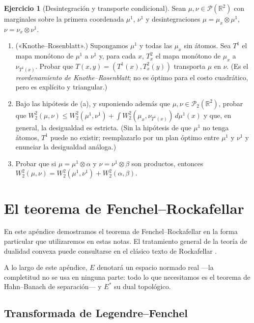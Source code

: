 \documentclass[12pt, a4paper]{amsbook}
\newcommand{\R}{{\mathbb R}}
\theoremstyle{remark}
\theoremstyle{definition}
\newtheorem{ejercicio}{Ejercicio}[chapter]
\numberwithin{section}{chapter}
\numberwithin{subsection}{section}
\numberwithin{equation}{section}
\numberwithin{figure}{chapter}
\begin{document}
\begin{ejercicio}[Desintegración y transporte condicional]\label{ejer.desint.condicional}
Sean $\mu,\nu\in\mathcal P(\R^2)$ con marginales sobre la primera coordenada
$\mu^1$, $\nu^1$ y desintegraciones $\mu=\mu_x\otimes\mu^1$, $\nu=\nu_x\otimes\nu^1$.
\begin{enumerate}[label=(\alph*)]
\item («Knothe--Rosenblatt».) Supongamos $\mu^1$ y todas las $\mu_x$ sin
átomos. Sea $T^1$ el mapa monótono de $\mu^1$ a $\nu^1$ y, para cada $x$,
$T^2_x$ el mapa monótono de $\mu_x$ a $\nu_{T^1(x)}$. Probar que
$T(x,y)=(T^1(x),T^2_x(y))$ transporta $\mu$ en $\nu$. (Es el
\emph{reordenamiento de Knothe--Rosenblatt}; no es óptimo para el costo
cuadrático, pero es explícito y triangular.)
\item Bajo las hipótesis de (a), y suponiendo además que $\mu,\nu\in\mathcal P_2(\R^2)$,
probar que $W_2^2(\mu,\nu)\le W_2^2(\mu^1,\nu^1)+\int W_2^2(\mu_x,\nu_{T^1(x)})\,d\mu^1(x)$
y que, en general, la desigualdad es estricta. (Sin la hipótesis de que
$\mu^1$ no tenga átomos, $T^1$ puede no existir; reemplazarlo por un plan
óptimo entre $\mu^1$ y $\nu^1$ y enunciar la desigualdad análoga.)
\item Probar que si $\mu=\mu^1\otimes\alpha$ y $\nu=\nu^1\otimes\beta$ son
productos, entonces $W_2^2(\mu,\nu)=W_2^2(\mu^1,\nu^1)+W_2^2(\alpha,\beta)$.
\end{enumerate}
\end{ejercicio}



\chapter{El teorema de Fenchel--Rockafellar}\label{ap.FR}

En este apéndice demostramos el teorema de Fenchel--Rockafellar en la forma
particular que utilizaremos en estas notas. El tratamiento general de la teoría
de dualidad convexa puede consultarse en el clásico texto de Rockafellar
\cite{Rockafellar1970}.

A lo largo de este apéndice, $E$ denotará un espacio normado real —la
completitud no se usa en ninguna parte: todo lo que necesitamos es el teorema
de Hahn--Banach de separación— y $E^*$ su
dual topológico.

\section{Transformada de Legendre--Fenchel}
\end{document}
